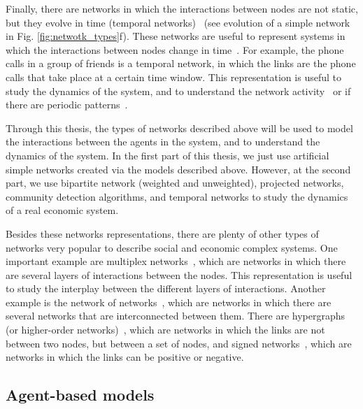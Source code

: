 Finally, there are networks in which the interactions between nodes are not static, but they evolve in time (temporal networks)~\cite{Holme2012Temporal} (see evolution of a simple network in Fig. \ref{fig:netwotk_types}f). These networks are useful to represent systems in which the interactions between nodes change in time~\cite{Perra2012ActivityDriven}. For example, the phone calls in a group of friends is a temporal network, in which the links are the phone calls that take place at a certain time window. This representation is useful to study the dynamics of the system, and to understand the network activity~\cite{karsai-2011} or if there are periodic patterns~\cite{Jo2012Circadian}.

Through this thesis, the types of networks described above will be used to model the interactions between the agents in the system, and to understand the dynamics of the system. In the first part of this thesis, we just use artificial simple networks created via the models described above. However, at the second part, we use bipartite network (weighted and unweighted), projected networks, community detection algorithms, and temporal networks to study the dynamics of a real economic system. 

Besides these networks representations, there are plenty of other types of networks very popular to describe social and economic complex systems. One important example are multiplex networks~\cite{gomez-2013,kivela2014multilayer,de2013mathematical}, which are networks in which there are several layers of interactions between the nodes. This representation is useful to study the interplay between the different layers of interactions. Another example is the network of networks~\cite{gao2011robustness, d2014networks}, which are networks in which there are several networks that are interconnected between them. There are hypergraphs (or higher-order networks)~\cite{battiston-2021}, which are networks in which the links are not between two nodes, but between a set of nodes, and signed networks~\cite{leskovec2010signed}, which are networks in which the links can be positive or negative. 


\subsection{\label{subsec:Agent-based models} Agent-based models}

